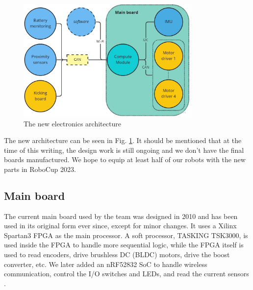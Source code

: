 \documentclass[runningheads]{llncs}
\begin{document}
\begin{figure}
	\centering
	\includegraphics[width=0.8\textwidth]{images/electronics-architecture.jpg}
	\caption{The new electronics architecture}
	\label{fig:electronics-architecture}
\end{figure}

The new architecture can be seen in Fig. \ref{fig:electronics-architecture}. It should be mentioned that at the time of this writing, the design work is still ongoing and we don't have the final boards manufactured. We hope to equip at least half of our robots with the new parts in RoboCup 2023.

\subsection{Main board}
The current main board used by the team was designed in 2010 and has been used in its original form ever since, except for minor changes. It uses a Xilinx Spartan3 FPGA as the main processor. A soft processor, TASKING TSK3000, is used inside the FPGA to handle more sequential logic, while the FPGA itself is used to read encoders, drive brushless DC (BLDC) motors, drive the boost converter, etc. We later added an nRF52832 SoC to handle wireless communication, control the I/O switches and LEDs, and read the current sensors \cite{ref_ETDP2018}.
\end{document}
